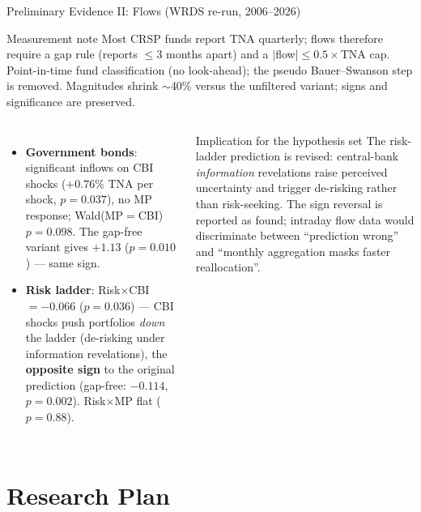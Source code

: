 \documentclass[aspectratio=169, 11pt]{beamer}
\begin{document}
\begin{frame}{Preliminary Evidence II: Flows (WRDS re-run, 2006--2026)}
  \footnotesize
  \begin{ablock}{Measurement note}
    Most CRSP funds report TNA quarterly; flows therefore require a gap rule (reports $\leq 3$ months apart)
    and a $|$flow$| \leq 0.5 \times$TNA cap. Point-in-time fund classification (no look-ahead); the pseudo
    Bauer--Swanson step is removed. Magnitudes shrink $\sim$40\% versus the unfiltered variant; signs and
    significance are preserved.
  \end{ablock}
  \begin{columns}[T]
    \begin{itemize}
      \item \textbf{Government bonds}: significant inflows on CBI shocks ($+0.76$\% TNA per shock,
            $p=0.037$), no MP response; Wald(MP$=$CBI) $p=0.098$. The gap-free variant gives
            $+1.13$ ($p=0.010$) --- same sign.
      \item \textbf{Risk ladder}: Risk$\times$CBI $= -0.066$ ($p=0.036$) --- CBI shocks push portfolios
            \emph{down} the ladder (de-risking under information revelations), the \textbf{opposite sign} to
            the original prediction (gap-free: $-0.114$, $p=0.002$). Risk$\times$MP flat ($p=0.88$).
    \end{itemize}
    \begin{fblock}[3.6cm]{Implication for the hypothesis set}
      The risk-ladder prediction is revised: central-bank \emph{information} revelations raise perceived
      uncertainty and trigger de-risking rather than risk-seeking. The sign reversal is reported as found;
      intraday flow data would discriminate between ``prediction wrong'' and ``monthly aggregation masks
      faster reallocation''.
    \end{fblock}
  \end{columns}
\end{frame}

\section{Research Plan}
\end{document}
